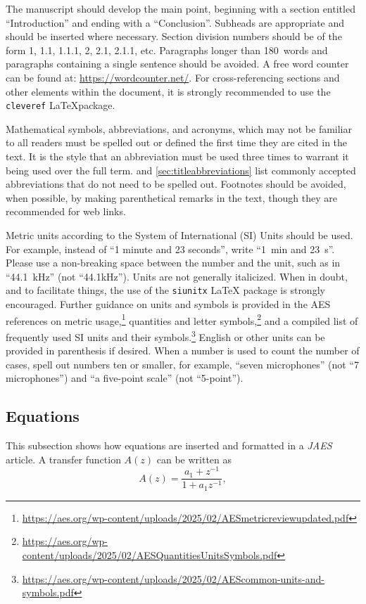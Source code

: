 \documentclass[fleqn,draft]{jaes}
\begin{document}
The manuscript should develop the main point, beginning with a section entitled ``Introduction'' and ending with a ``Conclusion''. Subheads are appropriate and should be inserted where necessary. Section division numbers should be of the form 1, 1.1, 1.1.1, 2, 2.1, 2.1.1, etc. Paragraphs longer than 180~words and paragraphs containing a single sentence should be avoided. A free word counter can be found at: \url{https://wordcounter.net/}. For cross-referencing sections and other elements within the document, it is strongly recommended to use the \texttt{cleveref} \LaTeX package.

Mathematical symbols, abbreviations, and acronyms, which may not be familiar to all readers must be spelled out or defined the first time they are cited in the text. It is the style that an abbreviation must be used three times to warrant it being used over the full term. 
 and \cref{sec:titleabbreviations} list commonly accepted abbreviations that do not need to be spelled out. 
Footnotes should be avoided, when possible, by making parenthetical remarks in the text, though they are recommended for web links. 

Metric units according to the System of International (SI) Units should be used. For example, instead of ``1 minute and 23 seconds'', write ``\SI{1}{\minute} and \SI{23}{\second}''. Please use a non-breaking space between the number and the unit, such as in ``44.1~kHz'' (not ``44.1kHz''). Units are not generally
italicized. When in doubt, and to facilitate things, the use of the
\texttt{siunitx} \LaTeX{} package is strongly encouraged. Further guidance on units and symbols is provided in the AES references on metric usage,\footnote{\url{https://aes.org/wp-content/uploads/2025/02/AESmetricreviewupdated.pdf}}
quantities and letter symbols,\footnote{\url{https://aes.org/wp-content/uploads/2025/02/AESQuantitiesUnitsSymbols.pdf}}
and a compiled list of frequently used SI units and their
symbols.\footnote{\url{https://aes.org/wp-content/uploads/2025/02/AEScommon-units-and-symbols.pdf}}
English or other units can be provided in parenthesis if desired. When a number is used to count the number of cases, spell out numbers ten or smaller, for example, ``seven microphones'' (not ``7 microphones'') and ``a five-point scale'' (not ``5-point'').

\subsection{Equations}
This subsection shows how equations are inserted and formatted in a \emph{JAES} article. A transfer function $A(z)$ can be written as
\begin{equation}
A(z) = \frac{{a_1  + z^{ - 1} }}{{1 + a_1 z^{ - 1} }},
\label{eq:transfer_function}
\end{equation}
\end{document}
